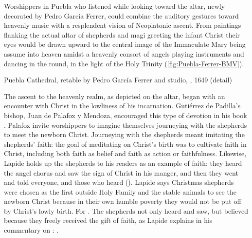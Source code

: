 Worshippers in Puebla who listened while looking toward the altar, newly
decorated by Pedro García Ferrer, could combine the auditory gestures toward
heavenly music with a resplendent vision of Neoplatonic ascent.%
    \Autocite{Gali:GarciaFerrer}
From paintings flanking the actual altar of shepherds and magi greeting the
infant Christ their eyes would be drawn upward to the central image of the
Immaculate Mary being assume into heaven amidst a heavenly consort of angels
playing instruments and dancing in the round, in the light of the Holy Trinity
(\cref{fig:Puebla-Ferrer-BMV}).

{Puebla Cathedral, retable by Pedro García Ferrer and studio,
, 1649 (detail)} 

The ascent to the heavenly realm, as depicted on the altar, began with an
encounter with Christ in the lowliness of his incarnation. 
Gutiérrez de Padilla's bishop, Juan de  Palafox y Mendoza, encouraged this type
of devotion in his book .%
    \Autocite{Palafox:Nochebuena}
Palafox invite worshippers to imagine themselves journeying with the shepherds
to meet the newborn Christ.
Journeying with the shepherds meant imitating the shepherds' faith: the goal of
meditating on Christ's birth was to cultivate faith in Christ, including both
faith as belief and faith as action or faithfulness.
Likewise, Lapide holds up the shepherds to his readers as an example of faith:
they heard the angel chorus and saw the sign of Christ in his manger, and then
they went and told everyone, and those who heard 
().
Lapide says Christmas shepherds were chosen as the first outside Holy Family and
the stable animals to see the newborn Christ because in their own humble poverty
they would not be put off by Christ's lowly birth.
For .%
    \Autocite[677, on ]{Lapide:Gospels19C}
The shepherds not only heard and saw, but believed because they freely received
the gift of faith, as Lapide explains in his commentary on
: .%
    \Autocite
    [882; Lapide seems to have a polemical eye here on his Calvinist compatriots
    in the Low Countries.]
    {Lapide:Gospels19C}

